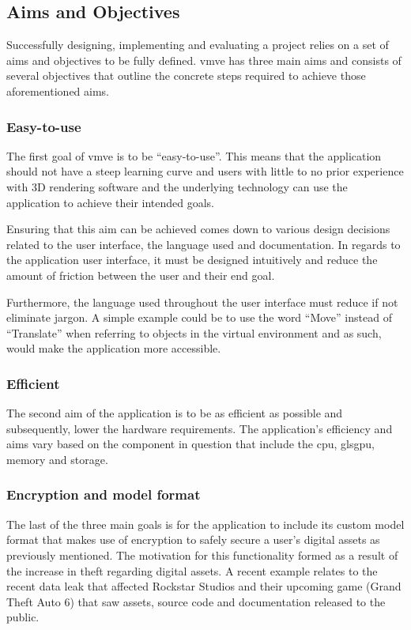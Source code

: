 \documentclass[11pt]{article}
\begin{document}
\subsection{Aims and Objectives}
Successfully designing, implementing and evaluating a project relies on a set of
aims and objectives to be fully defined. \gls{vmve} has three main aims and
consists of several objectives that outline the concrete steps required to
achieve those aforementioned aims.

\subsubsection{Easy-to-use}
The first goal of \gls{vmve} is to be ``easy-to-use''. This means that the
application should not have a steep learning curve and users with little to no
prior experience with 3D rendering software and the underlying technology can
use the application to achieve their intended goals.

Ensuring that this aim can be achieved comes down to various design decisions
related to the user interface, the language used and documentation. In regards
to the application user interface, it must be designed intuitively and reduce
the amount of friction between the user and their end goal.

Furthermore, the language used throughout the user interface must reduce if not
eliminate jargon. A simple example could be to use the word ``Move'' instead of
``Translate'' when referring to objects in the virtual environment and as such,
would make the application more accessible.

\subsubsection{Efficient}
The second aim of the application is to be as efficient as possible and
subsequently, lower the hardware requirements. The application's efficiency and
aims vary based on the component in question that include the \gls{cpu},
gls{gpu}, memory and storage.

\subsubsection{Encryption and model format}
The last of the three main goals is for the application to include its custom
model format that makes use of encryption to safely secure a user's digital
assets as previously mentioned. The motivation for this functionality formed as
a result of the increase in theft regarding digital assets. A recent example
relates to the recent data leak that affected Rockstar Studios and their
upcoming game (Grand Theft Auto 6) \cite{gta_leak} that saw assets, source code
and documentation released to the public.
\end{document}
